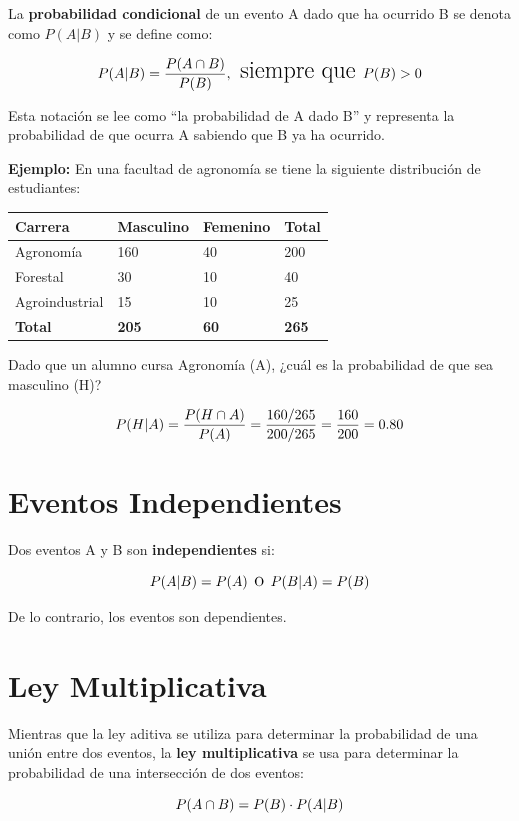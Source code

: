 \documentclass[
  spanish,
  letterpaper,
]{book}
\begin{document}
La \textbf{probabilidad condicional} de un evento A dado que ha ocurrido
B se denota como \(P(A|B)\) y se define como:

\[\LARGE P(A|B) = \frac{P(A \cap B)}{P(B)}, \text{ siempre que } P(B) > 0\]

Esta notación se lee como ``la probabilidad de A dado B'' y representa
la probabilidad de que ocurra A sabiendo que B ya ha ocurrido.

\textbf{Ejemplo:} En una facultad de agronomía se tiene la siguiente
distribución de estudiantes:

\begin{longtable}[]{@{}llll@{}}
\toprule\noalign{}
Carrera & Masculino & Femenino & Total \\
\midrule\noalign{}
\endhead
\bottomrule\noalign{}
\endlastfoot
Agronomía & 160 & 40 & 200 \\
Forestal & 30 & 10 & 40 \\
Agroindustrial & 15 & 10 & 25 \\
\textbf{Total} & \textbf{205} & \textbf{60} & \textbf{265} \\
\end{longtable}

Dado que un alumno cursa Agronomía (A), ¿cuál es la probabilidad de que
sea masculino (H)?

\[\Large P(H|A) = \frac{P(H \cap A)}{P(A)} = \frac{160/265}{200/265} = \frac{160}{200} = 0.80\]

\section{Eventos Independientes}\label{eventos-independientes}

Dos eventos A y B son \textbf{independientes} si:

\[\Large P(A|B) = P(A) \text{ o } P(B|A) = P(B)\]

De lo contrario, los eventos son dependientes.

\section{Ley Multiplicativa}\label{ley-multiplicativa}

Mientras que la ley aditiva se utiliza para determinar la probabilidad
de una unión entre dos eventos, la \textbf{ley multiplicativa} se usa
para determinar la probabilidad de una intersección de dos eventos:

\[\LARGE P(A \cap B) = P(B) \cdot P(A|B)\]
\end{document}
